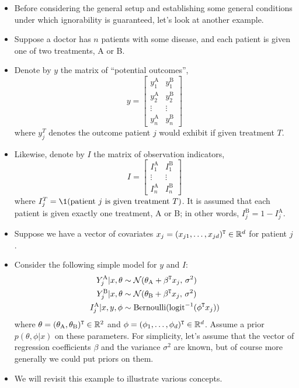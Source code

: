 \documentclass[12pt]{article}
\begin{document}
\begin{itemize}
\item Before considering the general setup and establishing some general conditions under which ignorability is guaranteed, let's look at another example. 
\item Suppose a doctor has $n$ patients with some disease, and each patient is given one of two treatments, A or B. 
\item Denote by $y$ the matrix of ``potential outcomes'',
$$ y = \begin{bmatrix} y_1^\text{A} &  y_1^\text{B} \\
y_2^\text{A} &  y_2^\text{B} \\
\vdots & \vdots \\
y_n^\text{A} &  y_n^\text{B}
\end{bmatrix} $$
where $y_j^T$ denotes the outcome patient $j$ would exhibit if given treatment $T$.
\item Likewise, denote by $I$ the matrix of observation indicators,
$$ I = \begin{bmatrix} I_1^\text{A} &  I_1^\text{B} \\
\vdots & \vdots \\
I_n^\text{A} &  I_n^\text{B}
\end{bmatrix} $$
where $I_j^T= \1(\text{patient $j$ is given treatment $T$})$. It is assumed that each patient is given exactly one treatment, A or B; in other words, $I_j^\text{B} = 1 -I_j^\text{A}$.
\item Suppose we have a vector of covariates $x_j = (x_{j 1},\ldots,x_{j d})^{\mathtt{T}} \in \mathbb{R}^d$ for patient $j$.
\item Consider the following simple model for $y$ and $I$:
\begin{align*}
Y_j^\text{A} | x,\theta &\sim \mathcal{N}(\theta_\text{A} + \beta^{\mathtt{T}} x_j,\, \sigma^2)\\
Y_j^\text{B} | x,\theta  &\sim \mathcal{N}(\theta_\text{B} + \beta^{\mathtt{T}} x_j,\, \sigma^2)\\
I_j^\text{A} | x,y,\phi &\sim \operatorname*{Bernoulli}(\mathrm{logit}^{-1}(\phi^{\mathtt{T}} x_j))
\end{align*}
where $\theta = (\theta_\text{A},\theta_\text{B})^{\mathtt{T}} \in \mathbb{R}^2$ and $\phi = (\phi_1,\ldots,\phi_d)^{\mathtt{T}}\in \mathbb{R}^d$. Assume a prior $p(\theta,\phi | x)$ on these parameters.
For simplicity, let's assume that the  vector of regression coefficients $\beta$ and the variance $\sigma^2$ are known, but of course more generally we could put priors on them.
\item We will revisit this example to illustrate various concepts.
\end{itemize}
\end{document}
